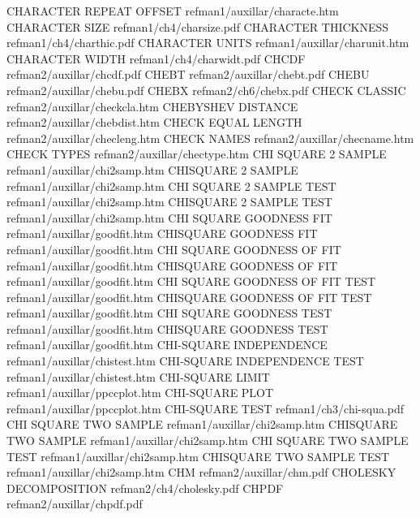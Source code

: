 CHARACTER REPEAT OFFSET                 refman1/auxillar/characte.htm
CHARACTER SIZE                          refman1/ch4/charsize.pdf
CHARACTER THICKNESS                     refman1/ch4/charthic.pdf
CHARACTER UNITS                         refman1/auxillar/charunit.htm
CHARACTER WIDTH                         refman1/ch4/charwidt.pdf
CHCDF                                   refman2/auxillar/chcdf.pdf
CHEBT                                   refman2/auxillar/chebt.pdf
CHEBU                                   refman2/auxillar/chebu.pdf
CHEBX                                   refman2/ch6/chebx.pdf
CHECK CLASSIC                           refman2/auxillar/checkcla.htm
CHEBYSHEV DISTANCE                      refman2/auxillar/chebdist.htm
CHECK EQUAL LENGTH                      refman2/auxillar/checleng.htm
CHECK NAMES                             refman2/auxillar/checname.htm
CHECK TYPES                             refman2/auxillar/chectype.htm
CHI SQUARE 2 SAMPLE                     refman1/auxillar/chi2samp.htm
CHISQUARE 2 SAMPLE                      refman1/auxillar/chi2samp.htm
CHI SQUARE 2 SAMPLE TEST                refman1/auxillar/chi2samp.htm
CHISQUARE 2 SAMPLE TEST                 refman1/auxillar/chi2samp.htm
CHI SQUARE GOODNESS FIT                 refman1/auxillar/goodfit.htm
CHISQUARE GOODNESS FIT                  refman1/auxillar/goodfit.htm
CHI SQUARE GOODNESS OF FIT              refman1/auxillar/goodfit.htm
CHISQUARE GOODNESS OF FIT               refman1/auxillar/goodfit.htm
CHI SQUARE GOODNESS OF FIT TEST         refman1/auxillar/goodfit.htm
CHISQUARE GOODNESS OF FIT TEST          refman1/auxillar/goodfit.htm
CHI SQUARE GOODNESS TEST                refman1/auxillar/goodfit.htm
CHISQUARE GOODNESS TEST                 refman1/auxillar/goodfit.htm
CHI-SQUARE INDEPENDENCE                 refman1/auxillar/chistest.htm
CHI-SQUARE INDEPENDENCE TEST            refman1/auxillar/chistest.htm
CHI-SQUARE LIMIT                        refman1/auxillar/ppccplot.htm
CHI-SQUARE PLOT                         refman1/auxillar/ppccplot.htm
CHI-SQUARE TEST                         refman1/ch3/chi-squa.pdf
CHI SQUARE TWO SAMPLE                   refman1/auxillar/chi2samp.htm
CHISQUARE TWO SAMPLE                    refman1/auxillar/chi2samp.htm
CHI SQUARE TWO SAMPLE TEST              refman1/auxillar/chi2samp.htm
CHISQUARE TWO SAMPLE TEST               refman1/auxillar/chi2samp.htm
CHM                                     refman2/auxillar/chm.pdf
CHOLESKY DECOMPOSITION                  refman2/ch4/cholesky.pdf
CHPDF                                   refman2/auxillar/chpdf.pdf
